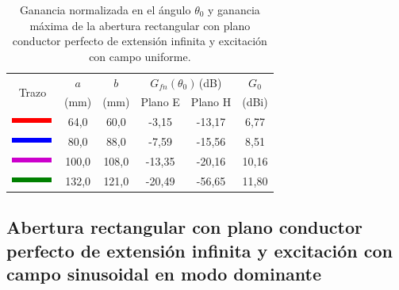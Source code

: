 \begin{table}[H]
\centering
\begin{tabular}{|c|c|c|c|c|c|}
\hline
\multirow{2}{*}{Trazo} & $a$ & $b$ & \multicolumn{2}{c|}{$G_{fn}\left(\theta_0\right)\,$(dB)} & $G_0$ \\
\cline{4-5}
& (mm) & (mm) & Plano E & Plano H & (dBi) \\
\hline
\includegraphics[scale = 1]{Figures/Estudio/linea_tabla_rojo} & 64,0 & 60,0 & -3,15 & -13,17 & 6,77 \\
\hline
\includegraphics[scale = 1]{Figures/Estudio/linea_tabla_azul} & 80,0 & 88,0 & -7,59 & -15,56 & 8,51 \\
\hline
\includegraphics[scale = 1]{Figures/Estudio/linea_tabla_violeta} & 100,0 & 108,0 & -13,35 & -20,16 & 10,16 \\
\hline
\includegraphics[scale = 1]{Figures/Estudio/linea_tabla_verde} & 132,0 & 121,0 & -20,49 & -56,65 & 11,80 \\
\hline
\end{tabular}
\caption{Ganancia normalizada en el ángulo $\theta_0$ y ganancia máxima de la abertura rectangular con plano conductor perfecto de extensión infinita y excitación con campo uniforme.}
\label{tabla_estudio:1}
\end{table}

\subsection{Abertura rectangular con plano conductor perfecto de extensión infinita y excitación con campo sinusoidal en modo dominante}
\label{subsec_estudio_abert_rect_inf_dom}

